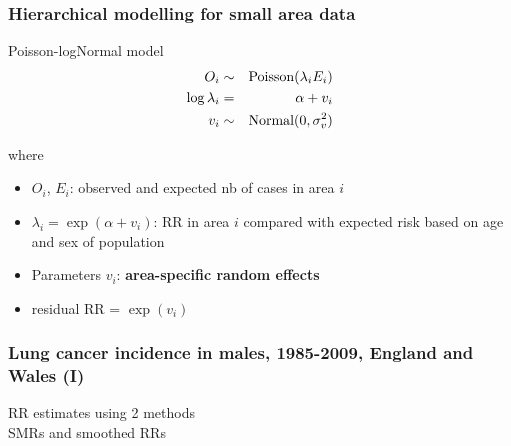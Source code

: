 \documentclass[slidestop,compress,serif,10pt]{beamer}
\begin{document}
\begin{frame}
    \frametitle{Hierarchical modelling for small area data}
\begin{block}{Poisson-logNormal model}
\vspace{-0.5cm}
\begin{eqnarray*}
O_i & \sim & \hbox{Poisson}(\lambda_i E_i) \\
\log \lambda_i & = & \alpha + v_i\\
v_i & \sim  & \hbox{Normal}(0, \sigma_v^2)
\end{eqnarray*}

\end{block}
where
\begin{itemize}
  \item $O_i$, $E_i$: observed and expected nb of cases in area $i$
  \item $\lambda_i=\exp (\alpha +  v_i)$: RR in area $i$ compared with expected risk based on age and sex of population
  \item Parameters $v_i$: {\bf area-specific random effects}
  \item residual RR = $\exp (v_i)$
\end{itemize}
\end{frame}
\begin{frame}
    \frametitle{Lung cancer incidence in males, 1985-2009, England and Wales (I)}
    \begin{center}
    RR estimates using 2 methods
        \\
        SMRs and smoothed RRs
    \end{center}
\end{frame}
\end{document}
